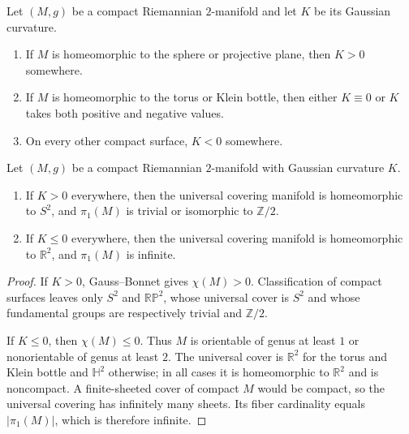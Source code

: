 \begin{corollary}
\label{cor:gaussian-curvature-and-topology}

Let $(M,g)$ be a compact Riemannian $2$-manifold and let $K$ be its Gaussian
curvature.
\begin{enumerate}
\item[(a)] If $M$ is homeomorphic to the sphere or projective plane, then
$K>0$ somewhere.
\item[(b)] If $M$ is homeomorphic to the torus or Klein bottle, then either
$K\equiv0$ or $K$ takes both positive and negative values.
\item[(c)] On every other compact surface, $K<0$ somewhere.
\end{enumerate}
\end{corollary}

\begin{corollary}
\label{cor:curvature-determines-cover}

Let $(M,g)$ be a compact Riemannian $2$-manifold with Gaussian curvature $K$.
\begin{enumerate}
\item[(a)] If $K>0$ everywhere, then the universal covering manifold is
homeomorphic to $S^2$, and $\pi_1(M)$ is trivial or isomorphic to
$\mathbb Z/2$.
\item[(b)] If $K\leq0$ everywhere, then the universal covering manifold is
homeomorphic to $\mathbb R^2$, and $\pi_1(M)$ is infinite.
\end{enumerate}
\end{corollary}

\begin{proof}
\sketch If $K>0$, Gauss--Bonnet gives $\chi(M)>0$. Classification of compact
surfaces leaves only $S^2$ and $\mathbb{RP}^2$, whose universal cover is
$S^2$ and whose fundamental groups are respectively trivial and
$\mathbb Z/2$.

If $K\leq0$, then $\chi(M)\leq0$. Thus $M$ is orientable of genus at least
$1$ or nonorientable of genus at least $2$. The universal cover is
$\mathbb R^2$ for the torus and Klein bottle and $\mathbb H^2$ otherwise; in
all cases it is homeomorphic to $\mathbb R^2$ and is noncompact. A finite-sheeted
cover of compact $M$ would be compact, so the universal covering has infinitely
many sheets. Its fiber cardinality equals $|\pi_1(M)|$, which is therefore
infinite.
\end{proof}

